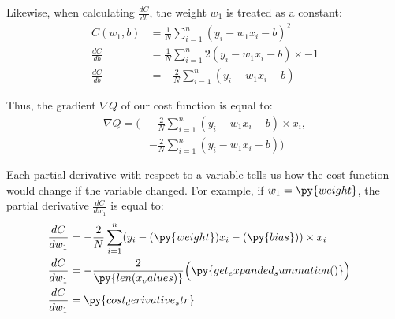 \documentclass[12pt]{article}
\begin{document}
Likewise, when calculating $\frac{dC}{db}$, the weight $w_1$ is treated as a constant:
\begin{align*}
	C(w_1, b)     & = \frac{1}{N} \sum_{i=1}^{n} (y_i - w_1x_i - b)^2
	\\
	\frac{dC}{db} & = \frac{1}{N} \sum_{i=1}^{n} 2(y_i - w_1x_i - b) \times -1
	\\
	\frac{dC}{db} & = -\frac{2}{N} \sum_{i=1}^{n} (y_i - w_1x_i - b)
\end{align*}

Thus, the gradient $\nabla Q$ of our cost function is equal to:
\begin{align*}
	\nabla Q = \Big(
	 &
	-\frac{2}{N} \sum_{i=1}^{n} (y_i - w_1x_i - b) \times x_i,
	\\
	 & -\frac{2}{N} \sum_{i=1}^{n} (y_i - w_1x_i - b)
	\Big)
\end{align*}



Each partial derivative with respect to a variable tells us how the cost function would change if the variable changed. For example, if $w_1 = \py{weight}$, the partial derivative $\frac{dC}{dw_1}$ is equal to:
\begin{align*}
	\frac{dC}{dw_1} & = -\frac{2}{N} \sum_{i=1}^{n} (y_i - (\py{weight})x_i - (\py{bias})) \times x_i
	\\
	\frac{dC}{dw_1} & =
	\begin{aligned}[t]
		-\frac{2}{\py{len(x_values)}}
		\Big( & \py{get_expanded_summation()}\Big)
	\end{aligned}
	\\
	\frac{dC}{dw_1} & = \py{cost_derivative_str}
\end{align*}
\end{document}
